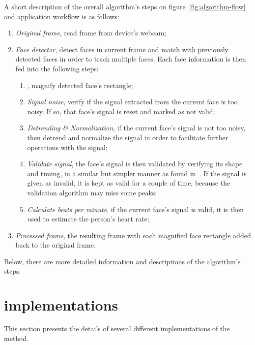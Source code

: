 A short description of the overall algorithm's steps on
figure~\ref{fig:algorithm-flow} and application workflow is as follows:

\begin{enumerate}
  \item \emph{Original frame}, read frame from device's webcam;
  \item \emph{Face detector}, detect faces in current frame and match with
        previously detected faces in order to track multiple faces.
        Each face information is then fed into the following steps:
  \begin{enumerate}
    \item \emph{\evm}, magnify detected face's rectangle;
    \item \emph{Signal noise}, verify if the signal extracted from the
          current face is too noisy. If so, that face's signal is reset
          and marked as not valid;
    \item \emph{Detrending \& Normalization}, if the current face's signal is
          not too noisy, then detrend and normalize the signal in order to
          facilitate further operations with the signal;
    \item \emph{Validate signal}, the face's signal is then validated by
          verifying its shape and timing, in a similar but simpler manner as
          found in~\cite{Nenova2010Automated}. If the signal is given as
          invalid, it is kept as valid for a couple of time, because the
          validation algorithm may miss some peaks;
    \item \emph{Calculate beats per minute}, if the current face's signal is
          valid, it is then used to estimate the person's heart rate;
  \end{enumerate}
  \item \emph{Processed frame}, the resulting frame with each magnified face
        rectangle added back to the original frame.
\end{enumerate}

Below, there are more detailed information and descriptions of the
algorithm's steps.

\section{\evm{} implementations} \label{sec:impl:evm}


This section presents the details of several different implementations of the
\evm{} method.

